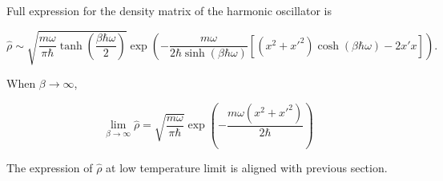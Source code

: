 Full expression for the density matrix of the harmonic oscillator is

\begin{equation}
    \hat{\rho} \sim \sqrt{\frac{m\omega}{\pi\hbar}\tanh(\frac{\beta\hbar\omega}{2})} \exp\left(-\frac{m\omega}{2\hbar\sinh(\beta\hbar\omega)}\left[(x^2+x'^2)\cosh(\beta\hbar\omega)-2x'x\right]\right).
\end{equation}

When $\beta\rightarrow\infty$,

\begin{equation}
    \lim_{\beta\rightarrow\infty}\hat{\rho} = \sqrt{\frac{m\omega}{\pi\hbar}}\exp(-\frac{m\omega(x^2+x'^2)}{2\hbar})
\end{equation}

The expression of $\hat{\rho}$ at low temperature limit is aligned with previous section.
